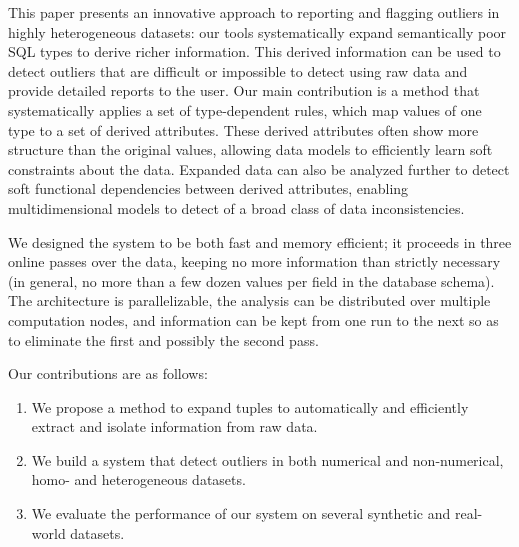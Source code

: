 This paper presents an innovative approach to reporting and flagging outliers in highly heterogeneous datasets: our tools systematically expand semantically poor SQL types to derive richer information.
This derived information can be used to detect outliers that are difficult or impossible to detect using raw data and provide detailed reports to the user. 
Our main contribution is a method that systematically applies a set of type-dependent rules, which map values of one type to a set of derived attributes.
These derived attributes often show more structure than the original values, allowing data models to efficiently learn soft constraints about the data. 
Expanded data can also be analyzed further to detect soft functional dependencies between derived attributes, enabling multidimensional models to detect of a broad class of data inconsistencies.

We designed the system to be both fast and memory efficient; it proceeds in three online passes over the data, keeping no more information than strictly necessary (in general, no more than a few dozen values per field in the database schema). The architecture is parallelizable, the analysis can be distributed over multiple computation nodes, and information can be kept from one run to the next so as to eliminate the first and possibly the second pass.

Our contributions are as follows:
\begin{enumerate}
\item We propose a method to expand tuples to automatically and efficiently extract and isolate information from raw data.
\item We build a system that detect outliers in both numerical and non-numerical, homo- and heterogeneous datasets.
\item We evaluate the performance of our system on several synthetic and real-world datasets.
\end{enumerate}

